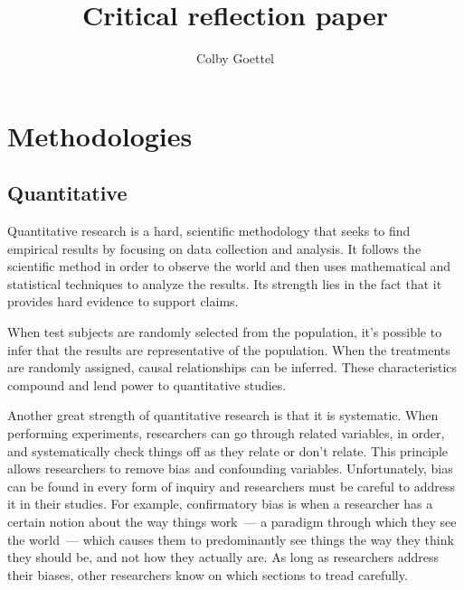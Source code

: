 \documentclass[man,natbib]{apa6}
\title{Critical reflection paper}
\author{Colby Goettel}
\affiliation{Brigham Young University}
\begin{document}
\maketitle


\section{Methodologies}


\subsection{Quantitative}
Quantitative research is a hard, scientific methodology that seeks to find empirical results by focusing on data collection and analysis. It follows the scientific method in order to observe the world and then uses mathematical and statistical techniques to analyze the results. Its strength lies in the fact that it provides hard evidence to support claims.

When test subjects are randomly selected from the population, it's possible to infer that the results are representative of the population. When the treatments are randomly assigned, causal relationships can be inferred. These characteristics compound and lend power to quantitative studies.

Another great strength of quantitative research is that it is systematic. When performing experiments, researchers can go through related variables, in order, and systematically check things off as they relate or don't relate. This principle allows researchers to remove bias and confounding variables. Unfortunately, bias can be found in every form of inquiry and researchers must be careful to address it in their studies. For example, confirmatory bias \citep{furlong2000research} is when a researcher has a certain notion about the way things work~--- a paradigm through which they see the world~--- which causes them to predominantly see things the way they think they should be, and not how they actually are. As long as researchers address their biases, other researchers know on which sections to tread carefully.
\end{document}
